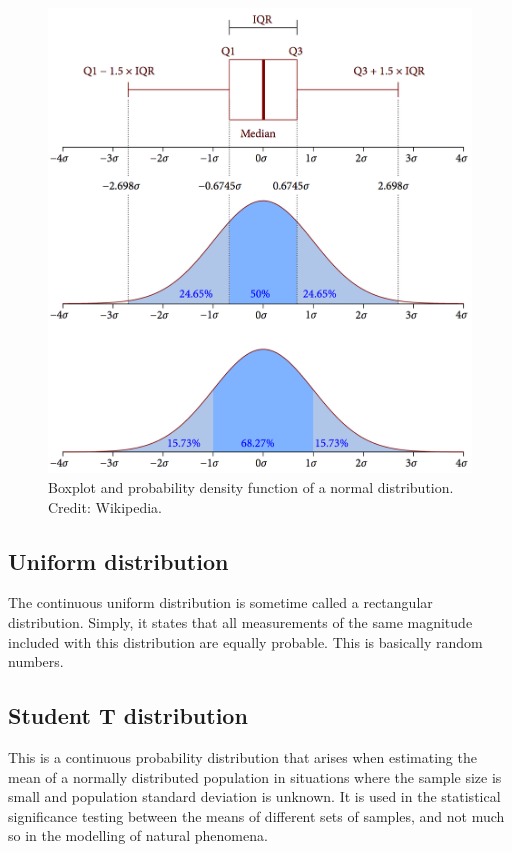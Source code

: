 \documentclass[english,10pt,a4paper,oneside]{book}
\theoremstyle{definition}
\theoremstyle{definition}
\theoremstyle{definition}
\theoremstyle{remark}
\begin{document}
\begin{figure}[h!]
\begin{center}
\includegraphics[width=0.7\linewidth]{figures/Boxplot_vs_PDF.png}
\end{center}
\caption{Boxplot and probability density function of a normal distribution. Credit: Wikipedia.}
\end{figure}

\hypertarget{uniform-distribution}{%
\subsection{Uniform distribution}\label{uniform-distribution}}

The continuous uniform distribution is sometime called a rectangular
distribution. Simply, it states that all measurements of the same
magnitude included with this distribution are equally probable. This is
basically random numbers.

\hypertarget{student-t-distribution}{%
\subsection{Student T distribution}\label{student-t-distribution}}

This is a continuous probability distribution that arises when
estimating the mean of a normally distributed population in situations
where the sample size is small and population standard deviation is
unknown. It is used in the statistical significance testing between the
means of different sets of samples, and not much so in the modelling of
natural phenomena.
\end{document}
